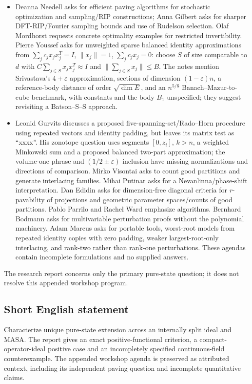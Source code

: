 \documentclass[11pt]{article}
\begin{document}
\begin{itemize}
\item Deanna Needell asks for efficient paving algorithms for stochastic optimization and sampling/RIP constructions; Anna Gilbert asks for sharper DFT-RIP/Fourier sampling bounds and use of Rudelson selection. Olaf Mordhorst requests concrete optimality examples for restricted invertibility. Pierre Youssef asks for unweighted sparse balanced identity approximations from $\sum_jc_jx_jx_j^T=I$, $\|x_j\|=1$, $\sum_jc_jx_j=0$: choose $S$ of size comparable to $d$ with $C\sum_{j\in S}x_jx_j^T\approx I$ and $\|\sum_{j\in S}x_j\|\leq B$. The notes mention Srivastava's $4+\varepsilon$ approximation, sections of dimension $(1-\varepsilon)n$, a reference-body distance of order $\sqrt{\dim E}$, and an $n^{5/6}$ Banach--Mazur-to-cube benchmark, with constants and the body $B_1$ unspecified; they suggest revisiting a Batson--S--S approach.
\item Leonid Gurvits discusses a proposed five-spanning-set/Rado--Horn procedure using repeated vectors and identity padding, but leaves its matrix test as ``xxxx''. His zonotope question uses segments $[0,z_i]$, $k>n$, a weighted Minkowski sum and a proposed balanced two-part approximation; the volume-one phrase and $(1/2\pm\varepsilon)$ inclusion have missing normalizations and directions of comparison. Mirko Visontai asks to count good partitions and generate interlacing families. Mihai Putinar asks for a Nevanlinna/phase-shift interpretation. Dan Edidin asks for dimension-free diagonal criteria for $r$-pavability of projections and geometric parameter spaces/counts of good partitions. Pablo Parrilo and Rachel Ward emphasize algorithms. Bernhard Bodmann asks for multivariable perturbation proofs without the polynomial machinery. Adam Marcus asks for portable tools, worst-root models from repeated identity copies with zero padding, weaker largest-root-only interlacing, and rank-two rather than rank-one perturbations. These agendas contain incomplete formulations and no supplied answers.
\end{itemize}
The research report concerns only the primary pure-state question; it does not resolve this appended workshop program.
\subsection{Short English statement}
Characterize unique pure-state extension across an internally split ideal and MASA. The report gives an exact positive-functional criterion, a compact-operator-ideal positive case and an incompletely specified continuous-field counterexample. The appended workshop agenda is preserved as attributed context, including its independent paving question and incomplete quantitative claims.
\end{document}
